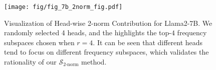 \begin{figure}[t]
  \centering
  \texttt{[image: fig/fig\_7b\_2norm\_fig.pdf]}
  \caption{Visualization of Head-wise 2-norm Contribution for Llama2-7B. We randomly selected 4 heads, and the  highlights the top-$4$ frequency subspaces chosen when $r=4$. It can be seen that different heads tend to focus on different frequency subspaces, which validates the rationality of our $\mathcal{S}_{\text{2-norm}}$ method.}
  \label{fig:7b_2norm}
\end{figure}
